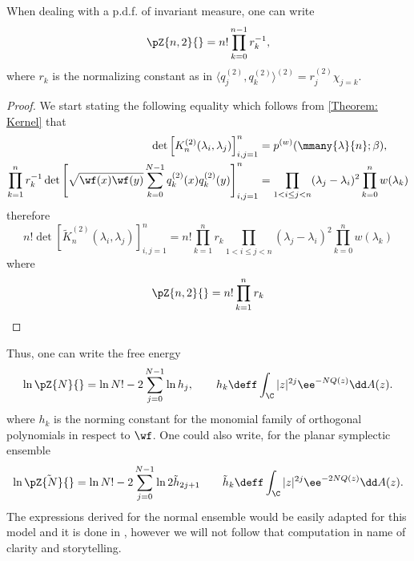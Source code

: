 \begin{lema}
	When dealing with a p.d.f. of invariant measure, one can write
	\begin{equation}
		\pZ{n,2}{} = n! \prod_{k=0}^{n-1} r_k^{-1},
	\end{equation}
	where $r_k$ is the normalizing constant as in $\langle q_j^{(2)}, q_k^{(2)} \rangle^{(2)} = r_j^{(2)} \chi_{j=k}$.
	\label{proposicaoosition: Partition function}
\end{lema}
\begin{proof}
	We start stating the following equality which follows from \ref{Theorem: Kernel} that
	\begin{align}
		\det\left[ K_n^{(2)}(\lambda_i, \lambda_j) \right]_{i,j=1}^{n} & =  p^{(w)}(\mmany{\lambda}{n};\beta), \\
		\prod_{k=1}^n r_k^{-1}  \det\left[ \sqrt{\wf(x) \wf(y)} \sum_{k=0}^{N-1} q_k^{(2)}(x) q_k^{(2)}(y) \right]_{i,j=1}^{n} & = \prod_{1 < i \leq j < n} (\lambda_j - \lambda_i)^2 \prod_{k=0}^{n} w(\lambda_k)
	\end{align}
	therefore
	\begin{equation}
		n! \det\left[ \tilde{K}_n^{(2)}(\lambda_i, \lambda_j) \right]_{i,j=1}^{n} = n! \prod_{k=1}^n r_k \prod_{1 < i \leq j < n} (\lambda_j - \lambda_i)^2 \prod_{k=0}^{n} w(\lambda_k)
	\end{equation}
	where
	\begin{equation}
		\pZ{n,2}{} = n! \prod_{k=1}^n r_k
	\end{equation}
\end{proof}
Thus, one can write the free energy
\begin{equation}
	\ln \pZ{N}{} = \ln{N!} - 2 \sum_{j=0}^{N-1} \ln{h_j},  \qquad h_k \deff \int_{\C} |z|^{2j} \ee^{-N Q(z)} \dd A(z).
	\label{Equation: Partition Function}
\end{equation}
where $h_k$ is the norming constant for the monomial family of orthogonal polynomials in respect to $\wf$. One could also write, for the planar symplectic ensemble 
\begin{equation}
	\ln \tilde{\pZ{N}{}} = \ln{N!} - 2 \sum_{j=0}^{N-1} \ln{2 \tilde{h}_{2j + 1}}  \qquad \tilde{h}_k \deff \int_{\C} |z|^{2j} \ee^{- 2 N Q(z)} \dd A(z). 
\end{equation} 
The expressions derived for the normal ensemble would be easily adapted for this model and it is done in \cite{Byun_2023}, however we will not follow that computation in name of clarity and storytelling.

